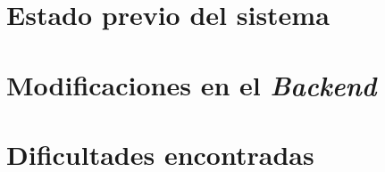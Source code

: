 \section{Estado previo del sistema}

\section{Modificaciones en el \textit{Backend}}


\section{Dificultades encontradas}
